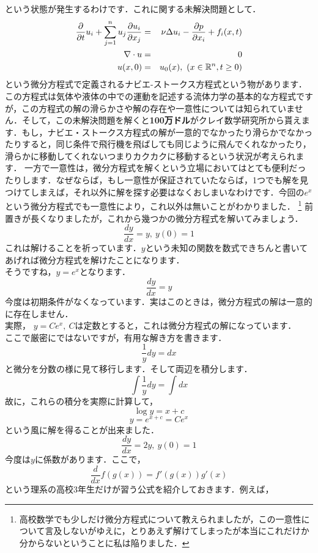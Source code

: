 という状態が発生するわけです．これに関する未解決問題として．
\begin{eqnarray*}
\frac{\partial}{\partial t}u_i + \sum_{j=1}^n u_j \frac{\partial u_i}{\partial x_j}
&=& \nu \Delta u_i - \frac{\partial p}{\partial x_i} + f_i(x,t)\\
\nabla \cdot u &=& 0\\
u(x,0) &=& u_0(x)  , \ (x\in \mathbb R^n, t \ge 0)
\end{eqnarray*}
という微分方程式で定義されるナビエ-ストークス方程式という物があります．
この方程式は気体や液体の中での運動を記述する流体力学の基本的な方程式ですが，この方程式の解の滑らかさや解の存在や一意性については知られていません．そして，この未解決問題を解くと\textbf{100万ドル}がクレイ数学研究所から貰えます．もし，ナビエ・ストークス方程式の解が一意的でなかったり滑らかでなかったりすると，同じ条件で飛行機を飛ばしても同じように飛んでくれなかったり，滑らかに移動してくれないつまりカクカクに移動するという状況が考えられます．
\exx
一方で一意性は，微分方程式を解くという立場においてはとても便利だったりします．なぜならば，もし一意性が保証されていたならば，1つでも解を見つけてしまえば，それ以外に解を探す必要はなくおしまいなわけです．今回の$e^x$という微分方程式でも一意性により，これ以外は無いことがわかりました．
\footnote{高校数学でも少しだけ微分方程式について教えられましたが，この一意性について言及しないがゆえに，とりあえず解けてしまったが本当にこれだけか分からないということに私は陥りました．}
前置きが長くなりましたが，これから幾つかの微分方程式を解いてみましょう．
\ex
\[
\frac{dy}{dx} = y ,\ y(0) = 1
\]
これは解けることを祈っています．$y$という未知の関数を数式できちんと書いてあげれば微分方程式を解けたことになります．\\
そうですね，$y = e^x$となります．
\exx
\ex
\[
\frac{dy}{dx} = y 
\]
今度は初期条件がなくなっています．実はこのときは，微分方程式の解は一意的に存在しません．\\
実際， $y = C e^x ,\ C$は定数とすると，これは微分方程式の解になっています．\\
ここで厳密にではないですが，有用な解き方を書きます．\\
\[
\frac{1}{y} dy = dx
\]
と微分を分数の様に見て移行します．そして両辺を積分します．
\[
\int \frac{1}{y} dy = \int dx
\]
故に，これらの積分を実際に計算して，
\[
\log y = x + c
\]
\[
y = e^{x+c} = C e^x
\]
という風に解を得ることが出来ました．
\exx
\ex
\[
\frac{dy}{dx} = 2y ,\ y(0)=1
\]
今度は$y$に係数があります．ここで，
\[
\frac{d}{dx}f(g(x)) = f'(g(x)) g'(x)
\]
という理系の高校3年生だけが習う公式を紹介しておきます．例えば，
